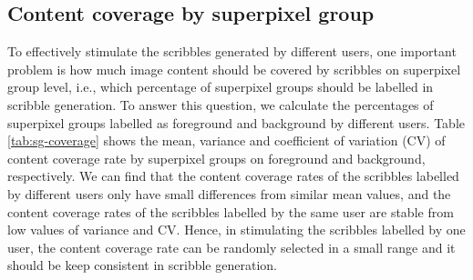 \documentclass[runningheads,a4paper]{llncs}
\begin{document}

\subsection{Content coverage by superpixel group}

To effectively stimulate the scribbles generated by different users, one important problem is how much image content should be covered by scribbles on superpixel group level, i.e., which percentage of superpixel groups should be labelled in scribble generation. To answer this question, we calculate the percentages of superpixel groups labelled as foreground and background by different users. Table \ref{tab:sg-coverage} shows the mean, variance and coefficient of variation (CV) of content coverage rate by superpixel groups on foreground and background, respectively. We can find that the content coverage rates of the scribbles labelled by different users only have small differences from similar mean values, and the content coverage rates of the scribbles labelled by the same user are stable from low values of variance and CV. Hence, in stimulating the scribbles labelled by one user, the content coverage rate can be randomly selected in a small range and it should be keep consistent in scribble generation.
\end{document}
